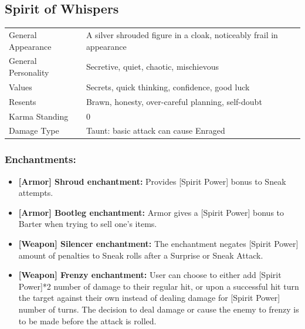 \documentclass[11pt,a4paper,twocolumn]{book}
\begin{document}
\bigskip	

\pagebreak
\subsection*{Spirit of Whispers}
{
	\begin{tabu} to 75mm{| X[l,4] | X[l,8] |}
		\hline
		General Appearance		& A silver shrouded figure in a cloak, noticeably frail in appearance	\\
        General Personality	   	& Secretive, quiet, chaotic, mischievous								\\
        Values     				& Secrets, quick thinking, confidence, good luck						\\
        Resents     			& Brawn, honesty, over-careful planning, self-doubt 					\\
        Karma Standing      	& 0																		\\
        Damage Type 			& Taunt: basic attack can cause Enraged	 								\\ \hline
	\end{tabu}
		
}

\medskip

\subsubsection*{Enchantments:}

\begin{itemize}
\item \textbf{ [Armor] Shroud enchantment:} Provides [Spirit Power] bonus to Sneak attempts.
	\item \textbf{ [Armor] Bootleg enchantment:} Armor gives a [Spirit Power] bonus to Barter when trying to sell one's items.
	\item \textbf{ [Weapon] Silencer enchantment:} The enchantment negates [Spirit Power] amount of penalties to Sneak rolls after a Surprise or Sneak Attack.

	\item \textbf{ [Weapon] Frenzy enchantment:} User can choose to either add [Spirit Power]*2 number of damage to their regular hit, or upon a successful hit turn the target against their own instead of dealing damage for [Spirit Power] number of turns. The decision to deal damage or cause the enemy to frenzy is to be made before the attack is rolled.
\end{itemize}
\end{document}
